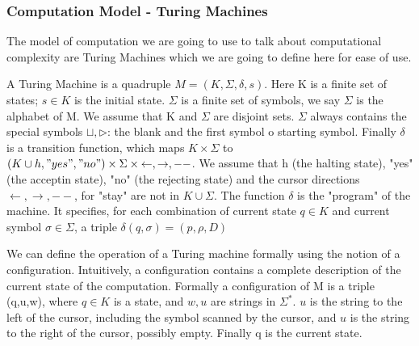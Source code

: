\subsubsection*{Computation Model - Turing Machines}
The model of computation we are going to use to talk about computational complexity are Turing Machines which we are going to define here for ease of use.\\
\begin{definition}
    A Turing Machine is a quadruple $M= (K, \Sigma, \delta, s)$. Here K is a finite set of states; $s \in K$ is the initial state. $\Sigma$ is a finite set of symbols, we say $\Sigma$ is the alphabet of M. We assume that K and $\Sigma$ are disjoint sets. $\Sigma$ always contains the special symbols $\sqcup, \triangleright$: the blank and the first symbol o starting symbol. Finally $\delta$ is a transition function, which maps $K\times \Sigma$ to $(K \cup {h,"yes","no"})\times \Sigma \times {\leftarrow, \rightarrow,-- }$. We assume that h (the halting state), "yes" (the acceptin state), "no" (the rejecting state) and the cursor directions $\leftarrow, \rightarrow, --$, for "stay" are not in $K \cup \Sigma$. The function $\delta$ is the "program" of the machine. It specifies, for each combination of current state $q\in K$ and current symbol $\sigma \in \Sigma$, a triple $\delta(q,\sigma) = (p,\rho,D)$
\end{definition}
\begin{definition}
    We can define the operation of a Turing machine formally using the notion of a configuration. Intuitively, a configuration contains a complete description of the current state of the computation. Formally a configuration of M is a triple (q,u,w), where $ q \in K$ is a state, and $w,u$ are strings in $\Sigma^*$. $u$ is the string to the left of the cursor, including the symbol scanned by the cursor, and $u$ is the string to the right of the cursor, possibly empty. Finally q is the current state. 
\end{definition}

